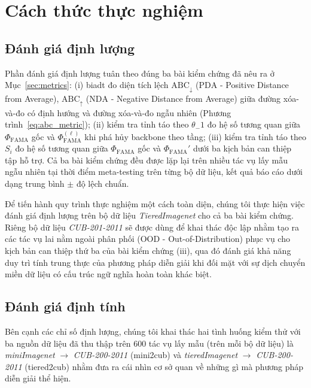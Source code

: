 \section{Cách thức thực nghiệm}
\label{sec:protocol}

\subsection{Đánh giá định lượng}
\label{subsec:quant_protocol}

Phần đánh giá định lượng tuân theo đúng ba bài kiểm chứng đã nêu ra ở Mục~\ref{sec:metrics}: (i) \acrshort{biadt} đo diện tích lệch $\mathrm{ABC}_\downarrow$ ($\mathrm{PDA}$ - Positive Distance from Average), $\mathrm{ABC}_\uparrow$ ($\mathrm{NDA}$ - Negative Distance from Average) giữa đường xóa-và-đo có định hướng và đường xóa-và-đo ngẫu nhiên (Phương trình~\eqref{eq:abc_metric}); (ii) kiểm tra tỉnh táo theo $\theta_-1$ đo hệ số tương quan giữa $\Phi_{\text{FAMA}}$ gốc và $\Phi_{\text{FAMA}}^{(\ell)}$ khi phá hủy backbone theo tầng; (iii) kiểm tra tỉnh táo theo $S_i$ đo hệ số tương quan giữa $\Phi_{\text{FAMA}}$ gốc và $\Phi_{\text{FAMA}}'$ dưới ba kịch bản can thiệp tập hỗ trợ. Cả ba bài kiểm chứng đều được lặp lại trên nhiều tác vụ lấy mẫu ngẫu nhiên tại thời điểm meta-testing trên từng bộ dữ liệu, kết quả báo cáo dưới dạng trung bình $\pm$ độ lệch chuẩn.

Để tiến hành quy trình thực nghiệm một cách toàn diện, chúng tôi thực hiện việc đánh giá định lượng trên bộ dữ liệu \emph{TieredImagenet} cho cả ba bài kiểm chứng. Riêng bộ dữ liệu \emph{CUB-201-2011} sẽ được dùng để khai thác độc lập nhằm tạo ra các tác vụ lai nằm ngoài phân phối (OOD - Out-of-Distribution) phục vụ cho kịch bản can thiệp thứ ba của bài kiểm chứng (iii), qua đó đánh giá khả năng duy trì tính trung thực của phương pháp diễn giải khi đối mặt với sự dịch chuyển miền dữ liệu có cấu trúc ngữ nghĩa hoàn toàn khác biệt.

\subsection{Đánh giá định tính}
\label{subsec:qual_protocol}

Bên cạnh các chỉ số định lượng, chúng tôi khai thác hai tình huống kiểm thử với ba nguồn dữ liệu đã thu thập trên 600 tác vụ lấy mẫu (trên mỗi bộ dữ liệu) là \emph{miniImagenet} $\to$ \emph{CUB-200-2011} (mini2cub) và \emph{tieredImagenet} $\to$ \emph{CUB-200-2011} (tiered2cub) nhằm đưa ra cái nhìn cơ sở quan về những gì mà phương pháp diễn giải thể hiện.  


